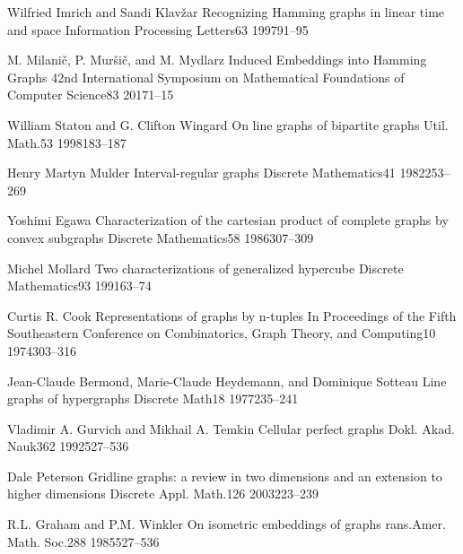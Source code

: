 \documentclass[12pt,a4paper,titlepage,openany]{report}
\begin{document}
 \begin{thebibliography}{99}
\thispagestyle{fancy}

  \articleInJournalManyAuthors
    {Wilfried Imrich and Sandi Klav\v zar}
    {Recognizing Hamming graphs in linear time and space}
   {Information Processing Letters}{63}
   {1997}{91--95}
   
  \articleInJournalManyAuthors
    {M. Milanič, P. Muršič, and M. Mydlarz}
    {Induced Embeddings into Hamming Graphs}
   {42nd International Symposium on Mathematical Foundations of Computer Science}{83}
   {2017}{1--15}   

  \articleInJournalManyAuthors
    {William Staton and G. Clifton Wingard}
    {On line graphs of bipartite graphs}
   {Util. Math.}{53}
   {1998}{183--187}
   
  \articleInJournalOneAuthor
    {Henry Martyn Mulder}
    {Interval-regular graphs}
   {Discrete Mathematics}{41}
   {1982}{253--269}  

  \articleInJournalOneAuthor
    {Yoshimi Egawa}
    {Characterization of the cartesian product of complete graphs by convex subgraphs}
   {Discrete Mathematics}{58}
   {1986}{307--309}       

  \articleInJournalOneAuthor
    {Michel Mollard}
    {Two characterizations of generalized hypercube}
   {Discrete Mathematics}{93}
   {1991}{63--74}

  \articleInJournalOneAuthor
    {Curtis R. Cook}
    {Representations of graphs by n-tuples}
   {In Proceedings of the Fifth Southeastern Conference on Combinatorics, Graph Theory, and Computing}{10}
   {1974}{303--316}
   
  \articleInJournalManyAuthors
    {Jean-Claude Bermond, Marie-Claude Heydemann, and Dominique Sotteau}
    {Line graphs of hypergraphs}
   {Discrete Math}{18}
   {1977}{235--241}    
   
  \articleInJournalManyAuthors
    {Vladimir A. Gurvich and Mikhail A. Temkin}
    {Cellular perfect graphs}
   {Dokl. Akad. Nauk}{362}
   {1992}{527--536}   

      
\articleInJournalOneAuthor
    {Dale Peterson}
    {Gridline graphs: a review in two dimensions and an extension to higher dimensions}
   {Discrete Appl. Math.}{126}
   {2003}{223--239}


  \articleInJournalManyAuthors
    {R.L. Graham and P.M. Winkler}
    {On isometric embeddings of graphs}
   {rans.Amer. Math. Soc.}{288}
   {1985}{527--536}
   

\end{thebibliography}
\end{document}
